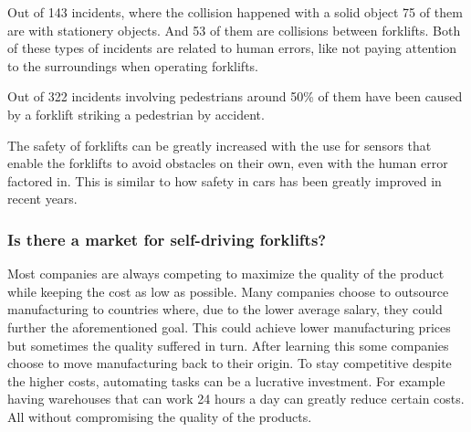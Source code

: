 \documentclass[11pt]{article}
\begin{document}
    Out of 143 incidents, where the collision happened with a solid object
    75 of them are with stationery objects. And 53 of them are collisions 
    between forklifts. Both of these types of incidents are related to 
    human errors, like not paying attention to the surroundings when 
    operating forklifts.

    Out of 322 incidents involving pedestrians around 50\% of them have 
    been caused by a forklift striking a pedestrian by accident.

    The safety of forklifts can be greatly increased with the use for sensors that
    enable the forklifts to avoid obstacles on their own, even with the human 
    error factored in. This is similar to how safety in cars has been greatly
    improved in recent years.

    \subsubsection{Is there a market for self-driving forklifts?}
    Most companies are always competing to maximize the quality of the product 
    while keeping the cost as low as possible. Many companies choose
    to outsource manufacturing to countries where, due to the lower
    average salary, they could further the aforementioned goal.
    This could achieve lower manufacturing prices but sometimes 
    the quality suffered in turn. After learning this some companies
    choose to move manufacturing back to their origin. To stay
    competitive despite the higher costs, automating tasks can be
    a lucrative investment. For example having warehouses that can
    work 24 hours a day can greatly reduce certain costs. All without
    compromising the quality of the products.
\end{document}
